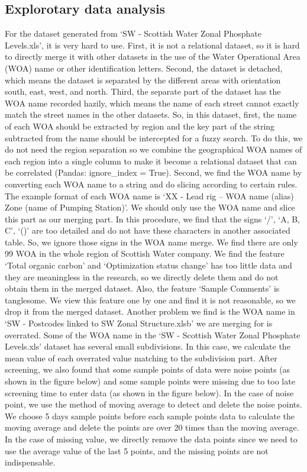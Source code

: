 \documentclass[11pt,twoside]{article}
\numberwithin{Theorem}{section}
\numberwithin{Definition}{section}
\numberwithin{Lemma}{section}
\numberwithin{Algorithm}{section}
\numberwithin{equation}{section}
\begin{document}
\clearpage

\subsection{Explorotary data analysis}
For the dataset generated from ‘SW - Scottish Water Zonal Phosphate Levels.xls’, it is very hard to use. First, it is not a relational dataset, so it is hard to directly merge it with other datasets in the use of the Water Operational Area (WOA) name or other identification letters. Second, the dataset is detached, which means the dataset is separated by the different areas with orientation south, east, west, and north. Third, the separate part of the dataset has the WOA name recorded hazily, which means the name of each street cannot exactly match the street names in the other datasets. So, in this dataset, first, the name of each WOA should be extracted by region and the key part of the string subtracted from the name should be intercepted for a fuzzy search. To do this, we do not need the region separation so we combine the geographical WOA names of each region into a single column to make it become a relational dataset that can be correlated (Pandas: ignore\_index = True). Second, we find the WOA name by converting each WOA name to a string and do slicing according to certain rules. The example format of each WOA name is ‘XX - Lead rig – WOA name (alias) Zone (name of Pumping Station)’. We should only use the WOA name and slice this part as our merging part. In this procedure, we find that the signs ‘/’, ‘A, B, C’, ‘()’ are too detailed and do not have these characters in another associated table. So, we ignore those signs in the WOA name merge. We find there are only 99 WOA in the whole region of Scottish Water company. We find the feature ‘Total organic carbon’ and ‘Optimization status change’ has too little data and they are meaningless in the research, so we directly delete them and do not obtain them in the merged dataset. Also, the feature ‘Sample Comments’ is tanglesome. We view this feature one by one and find it is not reasonable, so we drop it from the merged dataset. Another problem we find is the WOA name in ‘SW - Postcodes linked to SW Zonal Structure.xlsb’ we are merging for is overrated. Some of the WOA name in the ‘SW - Scottish Water Zonal Phosphate Levels.xls’ dataset has several small subdivisions. In this case, we calculate the mean value of each overrated value matching to the subdivision part. After screening, we also found that some sample points of data were noise points (as shown in the figure below) and some sample points were missing due to too late screening time to enter data (as shown in the figure below). In the case of noise point, we use the method of moving average to detect and delete the noise points. We choose 5 days sample points before each sample points data to calculate the moving average and delete the points are over 20 times than the moving average. In the case of missing value, we directly remove the data points since we need to use the average value of the last 5 points, and the missing points are not indispensable.
\end{document}
